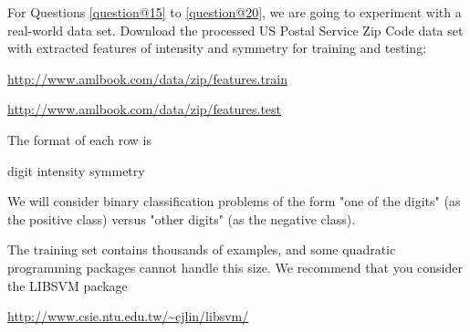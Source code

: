 \documentclass[a4paper,10pt]{exam}
\begin{document}
\begin{questions}
  \question For Questions \ref{question@15} to \ref{question@20}, we are going to experiment with a real-world data set. Download the processed US Postal Service Zip Code data set with extracted features of intensity and symmetry for training and testing:
  
  \url{http://www.amlbook.com/data/zip/features.train}
  
  \url{http://www.amlbook.com/data/zip/features.test}
  
  The format of each row is
  
  digit intensity symmetry 
  
  We will consider binary classification problems of the form "one of the digits" (as the positive class) versus "other digits" (as the negative class).
  
  The training set contains thousands of examples, and some quadratic programming packages cannot handle this size. We recommend that you consider the LIBSVM package
  
  \url{http://www.csie.ntu.edu.tw/~cjlin/libsvm/}
  

\end{questions}
\end{document}
